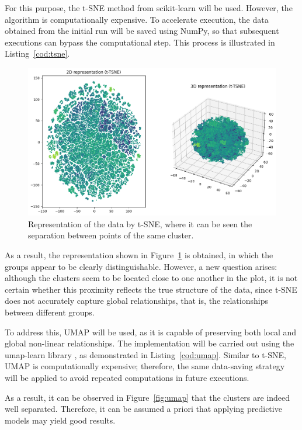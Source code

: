 For this purpose, the t-SNE method from scikit-learn \cite{scikit-learn-tsne} will be used. However, the algorithm is computationally expensive. To accelerate execution, the data obtained from the initial run will be saved using NumPy, so that subsequent executions can bypass the computational step. This process is illustrated in Listing~\ref{cod:tsne}.

\begin{figure}[H]
    \centering
    \includegraphics[width=1\textwidth]{figures/data_representation/tsne.png}
    \caption{Representation of the data by t-SNE, where it can be seen the separation between points of the same cluster.}
    \label{fig:tsne}
\end{figure}

As a result, the representation shown in Figure~\ref{fig:tsne} is obtained, in which the groups appear to be clearly distinguishable. However, a new question arises: although the clusters seem to be located close to one another in the plot, it is not certain whether this proximity reflects the true structure of the data, since t-SNE does not accurately capture global relationships, that is, the relationships between different groups.

To address this, UMAP \cite{mcinnes2020umapuniformmanifoldapproximation} will be used, as it is capable of preserving both local and global non-linear relationships. The implementation will be carried out using the umap-learn library \cite{umap-docs}, as demonstrated in Listing~\ref{cod:umap}. Similar to t-SNE, UMAP is computationally expensive; therefore, the same data-saving strategy will be applied to avoid repeated computations in future executions.

As a result, it can be observed in Figure~\ref{fig:umap} that the clusters are indeed well separated. Therefore, it can be assumed a priori that applying predictive models may yield good results.


